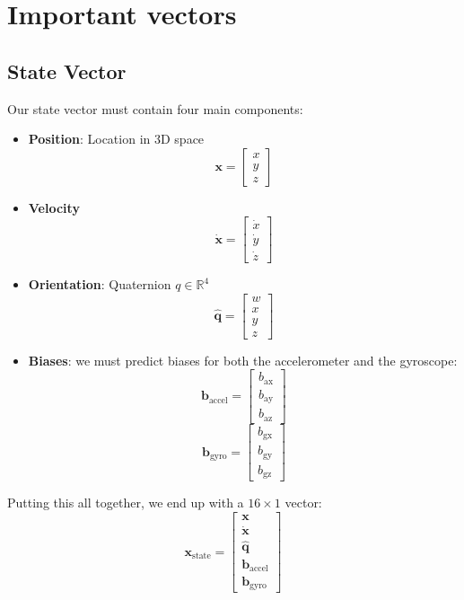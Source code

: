 \documentclass{article}
\begin{document}
\section{Important vectors}
\subsection{State Vector}
Our state vector must contain four main components:

\begin{itemize}
    \item \textbf{Position}: Location in 3D space
    \[
        \bm{x} = \begin{bmatrix} x \\ y \\ z \end{bmatrix}
    \]

    \item \textbf{Velocity}
    \[
        \dot{\bm{x}} = \begin{bmatrix} \dot{x} \\ \dot{y} \\ \dot{z} \end{bmatrix}
    \]

    \item \textbf{Orientation}: Quaternion $q \in \mathbb{R}^4$
    \[
        \hat{\bm{q}} = \begin{bmatrix} w \\ x \\ y \\ z \end{bmatrix}
    \]

    \item \textbf{Biases}: we must predict biases for both the accelerometer and the gyroscope:
    \[
        \bm{b}_{\text{accel}} = \begin{bmatrix} b_{\text{ax}} \\ b_{\text{ay}} \\ b_{\text{az}} \end{bmatrix}
    \]
    \[
        \bm{b}_{\text{gyro}} = \begin{bmatrix} b_{\text{gx}} \\ b_{\text{gy}} \\ b_{\text{gz}} \end{bmatrix}
    \]
\end{itemize}

Putting this all together, we end up with a $16 \times 1$ vector:
\[
\bm{x}_{\text{state}} =
\begin{bmatrix}
\bm{x} \\
\dot{\bm{x}} \\
\hat{\bm{q}} \\
\bm{b}_{\text{accel}} \\
\bm{b}_{\text{gyro}}
\end{bmatrix}
\]
\end{document}
